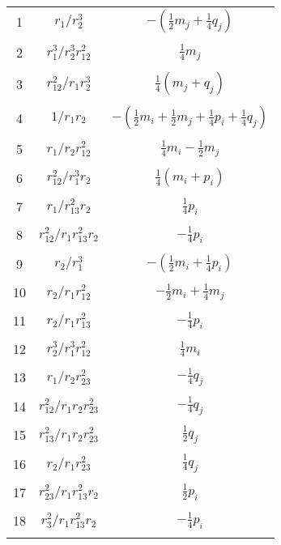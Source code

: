 \documentclass[Dissertation.tex]{subfiles}
\begin{document}
\begin{center}
\begin{longtable}{|c|c|c|}
1  & $r_1/r_2^3$  & $-(\frac{1}{2}m_j + \frac{1}{4}q_j)$ \\
&  &  \\
2  & $r_1^3/r_2^3 r_{12}^2$  & $\frac{1}{4}m_j$ \\
&  &  \\
3  & $r_{12}^2/r_1 r_2^3$  & $\frac{1}{4}(m_j + q_j)$ \\
&  &  \\
4  & $1/r_1 r_2$  & $-(\frac{1}{2}m_i + \frac{1}{2}m_j + \frac{1}{4}p_i + \frac{1}{4}q_j)$ \\
&  &  \\
5  & $r_1/r_2 r_{12}^2$  & $\frac{1}{4}m_i - \frac{1}{2}m_j$ \\
&  &  \\
6  & $r_{12}^2/r_1^3 r_2$  & $\frac{1}{4}(m_i + p_i)$ \\
&  &  \\
7  & $r_1/r_{13}^2 r_2$  & $\frac{1}{4} p_i$ \\
&  &  \\
8  & $r_{12}^2/r_1 r_{13}^2 r_2$  & $-\frac{1}{4} p_i$ \\
&  &  \\
9  & $r_2/r_1^3$  & $-(\frac{1}{2}m_i + \frac{1}{4}p_i)$ \\
&  &  \\
10  & $r_2/r_1 r_{12}^2$  & $-\frac{1}{2} m_i + \frac{1}{4} m_j$ \\
&  &  \\
11  & $r_2/r_1 r_{13}^2$  & $-\frac{1}{4}p_i$ \\
&  &  \\
12  & $r_2^3/r_1^3 r_{12}^2$  & $\frac{1}{4}m_i$ \\
&  &  \\
13  & $r_1/r_2 r_{23}^2$  & $-\frac{1}{4}q_j$ \\
&  &  \\
14  & $r_{12}^2/r_1 r_2 r_{23}^2$  & $-\frac{1}{4}q_j$ \\
&  &  \\
15  & $r_{13}^2/r_1 r_2 r_{23}^2$  & $\frac{1}{2}q_j$ \\
&  &  \\
16  & $r_2/r_1 r_{23}^2$  & $\frac{1}{4}q_j$ \\
&  &  \\
17  & $r_{23}^2/r_1 r_{13}^2 r_2$  & $\frac{1}{2}p_i$ \\
&  &  \\
18  & $r_3^2/r_1 r_{13}^2 r_2$  & $-\frac{1}{4}p_i$ \\
&  &  \\

\end{longtable}
\end{center}
\end{document}
